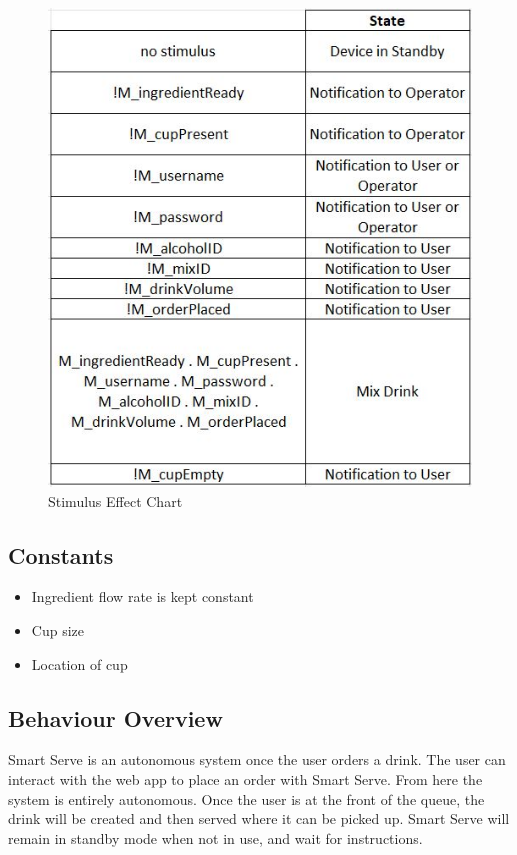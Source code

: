 \documentclass{article}
\begin{document}
    \begin{figure}[H]
    \centerline{\includegraphics[scale=0.9]{StimulusEffect.JPG}}
    \caption{Stimulus Effect Chart}
    \label{fig}
    \end{figure}

\subsection{Constants}
    \begin{itemize}
        \item Ingredient flow rate is kept constant
        \item Cup size
        \item Location of cup
    \end{itemize}

\subsection{Behaviour Overview}
    Smart Serve is an autonomous system once the user orders a drink. The user can interact with the web app to place an order with Smart Serve. From here the system is entirely autonomous. Once the user is at the front of the queue, the drink will be created and then served where it can be picked up. Smart Serve will remain in standby mode when not in use, and wait for instructions.
\end{document}
